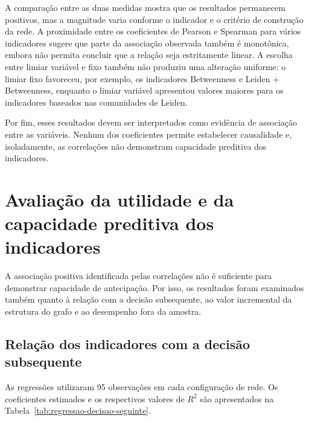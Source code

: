 A comparação entre as duas medidas mostra que os resultados permanecem positivos, 
mas a magnitude varia conforme o indicador e o critério de construção da rede. A 
proximidade entre os coeficientes de Pearson e Spearman para vários indicadores 
sugere que parte da associação observada também é monotônica, embora não permita 
concluir que a relação seja estritamente linear. A escolha entre limiar variável e 
fixo também não produziu uma alteração uniforme: o limiar fixo favoreceu, por 
exemplo, os indicadores Betweenness e Leiden + Betweenness, enquanto o limiar 
variável apresentou valores maiores para os indicadores baseados nas comunidades 
de Leiden.

Por fim, esses resultados devem ser interpretados como evidência de associação 
entre as variáveis. Nenhum dos coeficientes permite estabelecer causalidade e, 
isoladamente, as correlações não demonstram capacidade preditiva dos indicadores.




\section{Avaliação da utilidade e da capacidade preditiva dos indicadores}

A associação positiva identificada pelas correlações não é suficiente para
demonstrar capacidade de antecipação. Por isso, os resultados foram examinados
também quanto à relação com a decisão subsequente, ao valor incremental da
estrutura do grafo e ao desempenho fora da amostra.





\subsection{Relação dos indicadores com a decisão subsequente}

As regressões utilizaram 95 observações em cada configuração de rede. Os
coeficientes estimados e os respectivos valores de $R^2$ são apresentados na
Tabela~\ref{tab:regressao-decisao-seguinte}.

